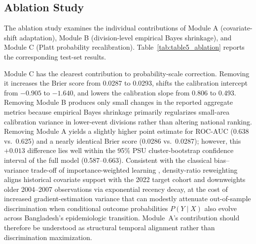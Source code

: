 \documentclass[a4paper,fleqn]{cas-sc}
\begin{document}
\subsection{Ablation Study}
\label{sec:res_ablation}

The ablation study examines the individual contributions of Module A (covariate-shift adaptation), Module B (division-level empirical Bayes shrinkage), and Module C (Platt probability recalibration). Table~\ref{tab:table5_ablation} reports the corresponding test-set results.

\begin{table}[pos=htbp]
\centering
\caption{Ablation results for the principal SWIFT-U5 components.}
\label{tab:table5_ablation}
\small
{}
\end{table}

Module C has the clearest contribution to probability-scale correction. Removing it increases the Brier score from 0.0287 to 0.0293, shifts the calibration intercept from $-0.905$ to $-1.640$, and lowers the calibration slope from 0.806 to 0.493. Removing Module B produces only small changes in the reported aggregate metrics because empirical Bayes shrinkage primarily regularizes small-area calibration variance in lower-event divisions rather than altering national ranking. Removing Module A yields a slightly higher point estimate for ROC-AUC (0.638 vs.\ 0.625) and a nearly identical Brier score (0.0286 vs.\ 0.0287); however, this $+0.013$ difference lies well within the 95\% PSU cluster-bootstrap confidence interval of the full model (0.587--0.663). Consistent with the classical bias--variance trade-off of importance-weighted learning \cite{shimodaira2000,sugiyama2012}, density-ratio reweighting aligns historical covariate support with the 2022 target cohort and downweights older 2004--2007 observations via exponential recency decay, at the cost of increased gradient-estimation variance that can modestly attenuate out-of-sample discrimination when conditional outcome probabilities $P(Y \mid X)$ also evolve across Bangladesh's epidemiologic transition. Module~A's contribution should therefore be understood as structural temporal alignment rather than discrimination maximization.
\end{document}
